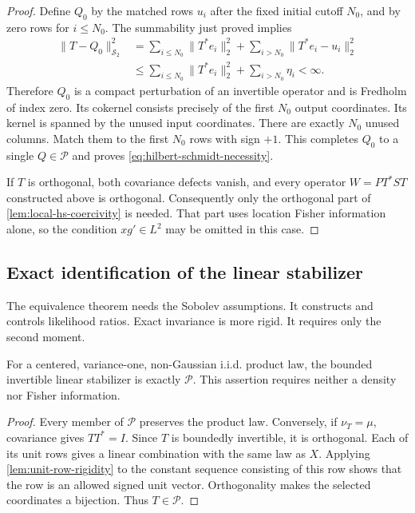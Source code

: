 \begin{proof}
Define $Q_0$ by the matched rows $u_i$ after the fixed initial cutoff
$N_0$, and by zero rows for $i\leq N_0$.
The summability just proved implies
\[
 \begin{aligned}
 \|T-Q_0\|_{\mathcal S_2}^2
 &=\sum_{i\leq N_0}\|T^*e_i\|_2^2
                      +\sum_{i>N_0}\|T^*e_i-u_i\|_2^2\\
 &\leq\sum_{i\leq N_0}\|T^*e_i\|_2^2+\sum_{i>N_0}\eta_i<\infty.
 \end{aligned}
 \]
Therefore $Q_0$ is a compact perturbation of an invertible operator and is
Fredholm of index zero.
Its cokernel consists precisely of the first $N_0$ output coordinates.
Its kernel is spanned by the unused input coordinates.
There are exactly $N_0$ unused columns.
Match them to the first $N_0$ rows with sign $+1$.
This completes $Q_0$ to a single $Q\in\mathcal P$ and proves
\eqref{eq:hilbert-schmidt-necessity}.

If $T$ is orthogonal, both covariance defects vanish, and every
operator $W=P T^*ST$ constructed above is orthogonal.
Consequently only the orthogonal part of
\cref{lem:local-hs-coercivity} is needed.  That part uses location
Fisher information alone, so the condition $xg'\in L^2$ may be
omitted in this case.
\end{proof}

\subsection{Exact identification of the linear stabilizer}
\label{sec:exact-stabilizer}

The equivalence theorem needs the Sobolev assumptions.
It constructs and controls likelihood ratios.
Exact invariance is more rigid.
It requires only the second moment.

\begin{proposition}
\label{prop:exact-linear-stabilizer}
For a centered, variance-one, non-Gaussian i.i.d. product law,
the bounded invertible linear stabilizer is exactly $\mathcal P$.
This assertion requires neither a density nor Fisher information.
\end{proposition}
\begin{proof}
Every member of $\mathcal P$ preserves the product law.
Conversely, if $\nu_T=\mu$, covariance gives $TT^*=I$.
Since $T$ is boundedly invertible, it is orthogonal.  Each of its unit
rows gives a linear combination with the same law as $X$.
Applying \cref{lem:unit-row-rigidity} to the constant sequence
consisting of this row shows that the row is an allowed signed unit
vector.  Orthogonality makes the selected coordinates a bijection.
Thus $T\in\mathcal P$.
\end{proof}
